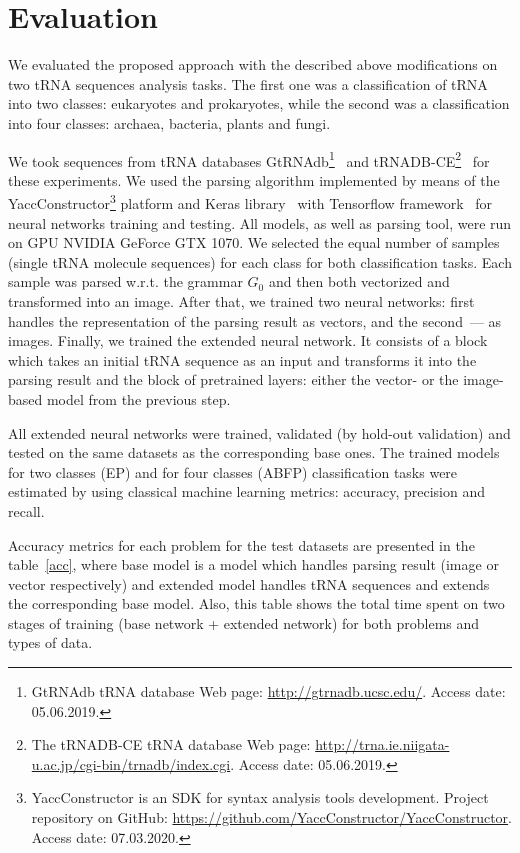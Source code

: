 \section{Evaluation}
We evaluated the proposed approach with the described above modifications on two tRNA sequences analysis tasks.
The first one was a classification of tRNA into two classes: eukaryotes and prokaryotes, while the second was a classification into four classes: archaea, bacteria, plants and fungi.


We took sequences from tRNA databases GtRNAdb\footnote{GtRNAdb tRNA database Web page: \url{http://gtrnadb.ucsc.edu/}. Access date: 05.06.2019.}~\cite{chan2016gtrnadb} and tRNADB-CE\footnote{The tRNADB-CE tRNA database Web page: \url{http://trna.ie.niigata-u.ac.jp/cgi-bin/trnadb/index.cgi}. Access date: 05.06.2019.}~\cite{abe2014trnadb} for these experiments.
We used the parsing algorithm implemented by means of the YaccConstructor\footnote{YaccConstructor is an SDK for syntax analysis tools development. Project repository on GitHub: \url{https://github.com/YaccConstructor/YaccConstructor}. Access date: 07.03.2020.} platform and Keras library~\cite{chollet2015keras} with Tensorflow framework~\cite{tensorflow2015-whitepaper} for neural networks training and testing.
All models, as well as parsing tool, were run on GPU NVIDIA GeForce GTX 1070.
We selected the equal number of samples (single tRNA molecule sequences) for each class for both classification tasks.
Each sample was parsed w.r.t. the grammar $G_0$ and then both vectorized and transformed into an image.
After that, we trained two neural networks: first handles the representation of the parsing result as vectors, and the second~--- as images.
Finally, we trained the extended neural network.
It consists of a block which takes an initial tRNA sequence as an input and transforms it into the parsing result and the block of pretrained layers: either the vector- or the image-based model from the previous step. 

All extended neural networks were trained, validated (by hold-out validation) and tested on the same datasets as the corresponding base ones.
The trained models for two classes (EP) and for four classes (ABFP) classification tasks were estimated by using classical machine learning metrics: accuracy, precision and recall.

Accuracy metrics for each problem for the test datasets are presented in the table~\ref{acc}, where base model is a model which handles parsing result (image or vector respectively) and extended model handles tRNA sequences and extends the corresponding base model. Also, this table shows the total time spent on two stages of training (base network + extended network) for both problems and types of data.

